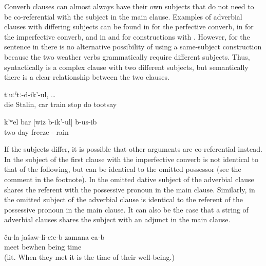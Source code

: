 Converb clauses can almost always have their own subjects that do not need to be co-referential with the subject in the main clause. Examples of adverbial clauses with differing subjects can be found in  for the perfective converb, in  for the imperfective converb, and in  and  for constructions with . However, for the sentence in  there is no alternative possibility of using a same-subject construction because the two weather verbs grammatically require different subjects. Thus, syntactically  is a complex clause with two different subjects, but semantically there is a clear relationship between the two clauses.
%
\begin{exe}
	\ex	\label{ex:Stalin died, and the cars, the trains were stopped making tooot}
	 	tːuːˁtː-d-ik'-ul, \ldots\\
		die	Stalin,	car	train	stop do 	tootsay\\
	\glt	{}

	\ex	\label{ex:‎Two days it was freezing and raining}
	\gll	k'ʷel	bar	[wiz	b-ik'-ul]	b-us-ib\\
		two	day	freeze	-	rain\\
	\glt	{}
\end{exe}

If the subjects differ, it is possible that other arguments are co-referential instead. In  the subject of the first clause with the imperfective converb is not identical to that of the following, but can be identical to the omitted possessor (see the comment in the footnote). In  the omitted dative subject of the adverbial clause shares the referent with the possessive pronoun in the main clause. Similarly, in  the omitted subject of the adverbial clause is identical to the referent of the possessive pronoun in the main clause. It can also be the case that a string of adverbial clauses shares the subject with an adjunct in the main clause.
%
\begin{exe}
	\ex	\label{ex:When they got married, they had a good life}
	\gll	[can	ka-b-iž-ib=qːel]	ču-la	jašaw-li-cːe-b	zamana	ca-b\\
		meet	bewhen		being	time	\\
	\glt	{} (lit. When they met it is the time of their well-being.)
\end{exe}

